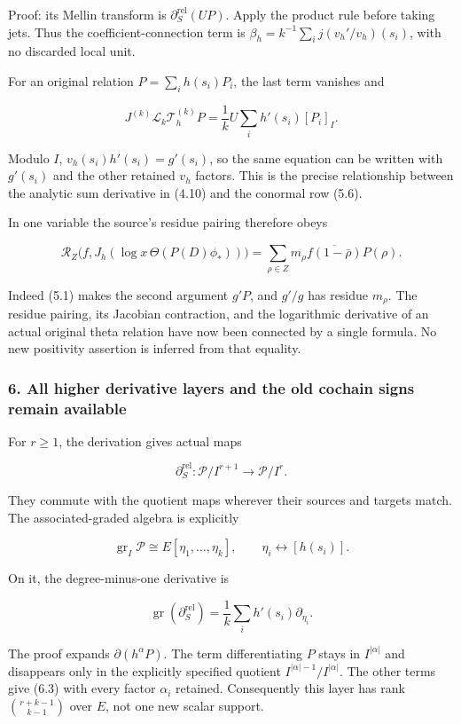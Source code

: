 Proof: its Mellin transform is \(\partial_S^{\mathrm{rel}}(UP)\). Apply
the product rule before taking jets. Thus the coefficient-connection
term is \(\beta_h=k^{-1}\sum_i j(v_h'/v_h)(s_i)\), with no discarded
local unit.

For an original relation \(P=\sum_i h(s_i)P_i\), the last term vanishes
and

\[\boxed{J^{(k)}\mathscr L_k\mathcal T_h^{(k)}P
=\frac1kU\sum_i h'(s_i)[P_i]_I.}\tag{5.12}\]

Modulo \(I\), \(v_h(s_i)h'(s_i)=g'(s_i)\), so the same equation can be
written with \(g'(s_i)\) and the other retained \(v_h\) factors. This is
the precise relationship between the analytic sum derivative in (4.10)
and the conormal row (5.6).

In one variable the source's residue pairing therefore obeys

\[\boxed{\mathscr R_Z\bigl(f,J_h(\log x\,\Theta(P(D)\phi_*))\bigr)
=\sum_{\rho\in Z}m_\rho\overline{f(1-\bar\rho)}P(\rho).}\tag{5.13}\]

Indeed (5.1) makes the second argument \(g'P\), and \(g'/g\) has residue
\(m_\rho\). The residue pairing, its Jacobian contraction, and the
logarithmic derivative of an actual original theta relation have now
been connected by a single formula. No new positivity assertion is
inferred from that equality.

\subsubsection{6. All higher derivative layers and the old cochain signs
remain
available}\label{sum_connection:all-higher-derivative-layers-and-the-old-cochain-signs-remain-available}

For \(r\ge1\), the derivation gives actual maps

\[\partial_S^{\mathrm{rel}}:\mathcal P/I^{r+1}\longrightarrow\mathcal P/I^r.\tag{6.1}\]

They commute with the quotient maps wherever their sources and targets
match. The associated-graded algebra is explicitly

\[\operatorname{gr}_I\mathcal P\cong E[\eta_1,\ldots,\eta_k],\qquad
\eta_i\longleftrightarrow[h(s_i)].\tag{6.2}\]

On it, the degree-minus-one derivative is

\[\boxed{\operatorname{gr}(\partial_S^{\mathrm{rel}})
=\frac1k\sum_i h'(s_i)\partial_{\eta_i}.}\tag{6.3}\]

The proof expands \(\partial(h^\alpha P)\). The term differentiating
\(P\) stays in \(I^{|\alpha|}\) and disappears only in the explicitly
specified quotient \(I^{|\alpha|-1}/I^{|\alpha|}\). The other terms give
(6.3) with every factor \(\alpha_i\) retained. Consequently this layer
has rank \(\binom{r+k-1}{k-1}\) over \(E\), not one new scalar support.

